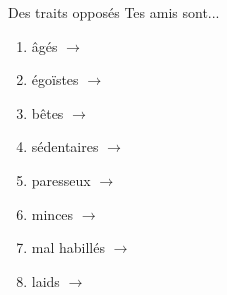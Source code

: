 \begin{frame}{Des traits opposés}
  Tes amis sont...
  \begin{enumerate}
    \item âgés $\to$ \underline{}
    \item égoïstes $\to$ \underline{}
    \item bêtes $\to$ \underline{}
    \item sédentaires $\to$ \underline{}
    \item paresseux $\to$ \underline{}
    \item minces $\to$ \underline{}
    \item mal habillés $\to$ \underline{}
    \item laids $\to$ \underline{}
  \end{enumerate}
\end{frame}